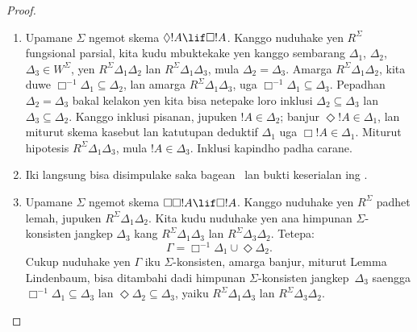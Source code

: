 \documentclass[../../../include/open-logic-section]{subfiles}
\begin{document}
\begin{proof}
  \begin{enumerate}
  \item Upamane $\Sigma$ ngemot skema $\Diamond !A \lif
    \Box !A$. Kanggo nuduhake yen $R^\Sigma$ fungsional parsial,
    kita kudu mbuktekake yen kanggo sembarang $\Delta_1$, $\Delta_2$,
    $\Delta_3 \in W^\Sigma$, yen $R^\Sigma \Delta_1\Delta_2$ lan
    $R^\Sigma \Delta_1\Delta_3$, mula $\Delta_2=\Delta_3$. Amarga
    $R^\Sigma \Delta_1\Delta_2$, kita duwe $\Box^{-1}\Delta_1
    \subseteq \Delta_2$, lan amarga $R^\Sigma \Delta_1\Delta_3$,
    uga $\Box^{-1}\Delta_1 \subseteq \Delta_3$. Pepadhan
    $\Delta_2=\Delta_3$ bakal kelakon yen kita bisa netepake loro
    inklusi $\Delta_2 \subseteq \Delta_3$ lan $\Delta_3 \subseteq
    \Delta_2$. Kanggo inklusi pisanan, jupuken $!A \in \Delta_2$;
    banjur $\Diamond!A \in \Delta_1$, lan miturut skema kasebut lan
    katutupan deduktif $\Delta_1$ uga $\Box!A \in \Delta_1$.
    Miturut hipotesis $R^\Sigma \Delta_1\Delta_3$, mula
    $!A \in \Delta_3$. Inklusi kapindho padha carane.

  \item Iki langsung bisa disimpulake saka bagean~
    lan bukti keserialan ing .

  \item Upamane $\Sigma$ ngemot skema $\Box\Box!A \lif \Box!A$.
    Kanggo nuduhake yen $R^\Sigma$ padhet lemah, jupuken $R^\Sigma
    \Delta_1\Delta_2$. Kita kudu nuduhake yen ana himpunan
    $\Sigma$-konsisten jangkep $\Delta_3$ kang $R^\Sigma
    \Delta_1\Delta_3$ lan $R^\Sigma \Delta_3\Delta_2$. Tetepa:
    \[
    \Gamma = \Box^{-1}\Delta_1 \cup \Diamond\Delta_2.
    \]
    Cukup nuduhake yen $\Gamma$ iku $\Sigma$-konsisten, amarga banjur,
    miturut Lemma Lindenbaum, bisa ditambahi dadi himpunan
    $\Sigma$-konsisten jangkep~$\Delta_3$ saengga $\Box^{-1}\Delta_1
    \subseteq \Delta_3$ lan $\Diamond\Delta_2 \subseteq \Delta_3$,
    yaiku $R^\Sigma \Delta_1\Delta_3$ lan $R^\Sigma
    \Delta_3\Delta_2$.


\end{enumerate}
\end{proof}
\end{document}
